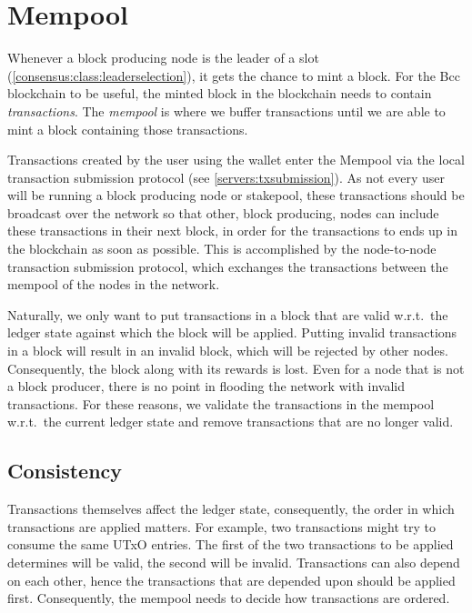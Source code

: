 \chapter{Mempool}
\label{mempool}

Whenever a block producing node is the leader of a slot
(\cref{consensus:class:leaderselection}), it gets the chance to mint a block.
For the Bcc blockchain to be useful, the minted block in the blockchain
needs to contain \emph{transactions}. The \emph{mempool} is where we buffer
transactions until we are able to mint a block containing those transactions.

Transactions created by the user using the wallet enter the Mempool via the
local transaction submission protocol (see \cref{servers:txsubmission}). As not
every user will be running a block producing node or stakepool, these
transactions should be broadcast over the network so that other, block
producing, nodes can include these transactions in their next block, in order
for the transactions to ends up in the blockchain as soon as possible. This is
accomplished by the node-to-node transaction submission protocol,
which exchanges the transactions between the mempool of the nodes in the
network.

Naturally, we only want to put transactions in a block that are valid
w.r.t.\ the ledger state against which the block will be applied. Putting
invalid transactions in a block will result in an invalid block, which will be
rejected by other nodes. Consequently, the block along with its rewards is lost.
Even for a node that is not a block producer, there is no point in flooding the
network with invalid transactions. For these reasons, we validate the
transactions in the mempool w.r.t.\ the current ledger state and remove
transactions that are no longer valid.

\section{Consistency}
\label{mempool:consistency}

Transactions themselves affect the ledger state, consequently, the order in
which transactions are applied matters. For example, two transactions might try
to consume the same UTxO entries. The first of the two transactions to be
applied determines will be valid, the second will be invalid. Transactions can
also depend on each other, hence the transactions that are depended upon should
be applied first. Consequently, the mempool needs to decide how transactions are
ordered.

